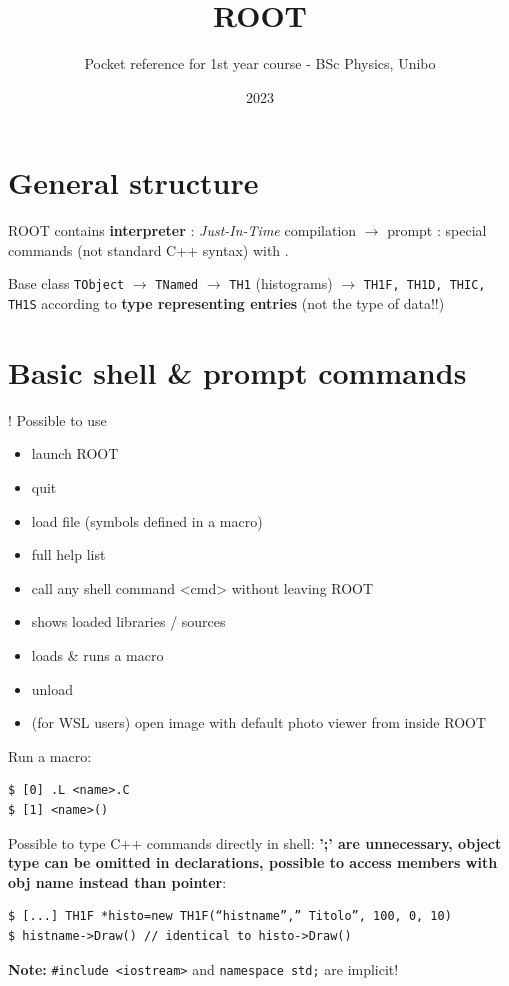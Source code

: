 \documentclass[10pt, oneside]{article}
\title{ROOT}
\author{Pocket reference for 1st year course - BSc Physics, Unibo}
\date{2023}
\begin{document}
\maketitle

\tableofcontents
\newpage
\section{General structure}

ROOT contains \textbf{interpreter} : \textit{Just-In-Time} compilation $\rightarrow$ prompt : special commands (not standard C++ syntax) with .

Base class \texttt{TObject} $\rightarrow$ \texttt{TNamed} $\rightarrow$ \texttt{TH1} (histograms) $\rightarrow$ \texttt{TH1F, TH1D, THIC, TH1S} according to \textbf{type representing entries} (not the type of data!!)

\section{Basic shell \& prompt commands}
! Possible to use 
\begin{itemize}
\item {} launch ROOT
\item {} quit
\item {} load file (symbols defined in a macro)
\item {}  full help list
\item {} call any shell command <cmd> without leaving ROOT
\item {} shows loaded libraries / sources
\item {} loads \& runs a macro
\item {} unload
\item {} (for WSL users) open image with default photo viewer from inside ROOT
\end{itemize}
Run a macro:
\begin{verbatim}
$ [0] .L <name>.C
$ [1] <name>()
\end{verbatim}
Possible to type C++ commands directly in shell: \textbf{';' are unnecessary, object type can be omitted in declarations, possible to access members with obj name instead than pointer}:
\begin{verbatim}
$ [...] TH1F *histo=new TH1F(“histname”,” Titolo”, 100, 0, 10)
$ histname->Draw() // identical to histo->Draw()
\end{verbatim}
\textbf{Note:} \texttt{\#include <iostream>} and \texttt{namespace std;} are implicit!
\end{document}
